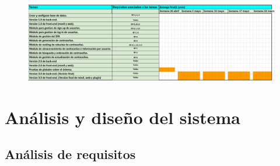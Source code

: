 \documentclass{article}
\begin{document}
\begin{figure}[H]
    \centering
        \includegraphics[height=0.18\textheight]{../images/diag-gantt-2.png}
    \label{gantt-2}
\end{figure}
\pagebreak

\section{Análisis y diseño del sistema}

\subsection{Análisis de requisitos}
\end{document}
